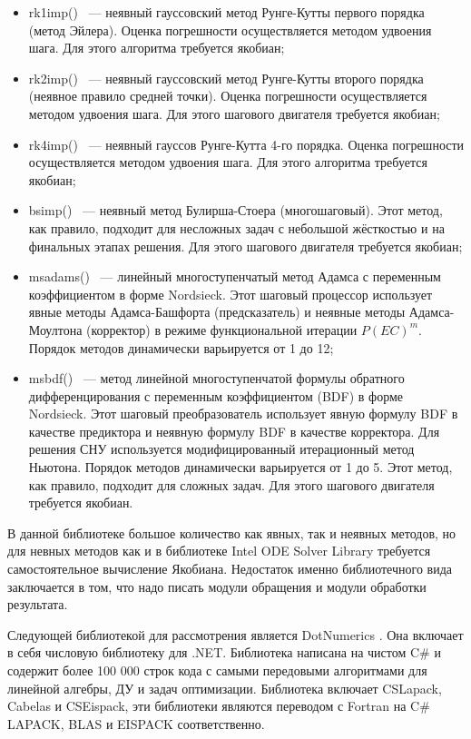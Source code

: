 \begin{itemize}
    \item rk1imp() ~--- неявный гауссовский метод Рунге-Кутты первого порядка (метод Эйлера). Оценка погрешности осуществляется методом
        удвоения шага. Для этого алгоритма требуется якобиан;
    \item rk2imp() ~--- неявный гауссовский метод Рунге-Кутты второго порядка (неявное правило средней точки). Оценка
        погрешности осуществляется методом удвоения шага. Для этого шагового двигателя требуется якобиан;
    \item rk4imp() ~--- неявный гауссов Рунге-Кутта 4-го порядка. Оценка погрешности осуществляется методом удвоения шага. Для этого
        алгоритма требуется якобиан;
    \item bsimp() ~--- неявный метод Булирша-Стоера (многошаговый). Этот метод, как правило, подходит для несложных задач с небольшой
        жёсткостью и на финальных этапах решения. Для этого шагового двигателя требуется якобиан;
    \item msadams() ~--- линейный многоступенчатый метод Адамса с переменным коэффициентом в форме Nordsieck. Этот шаговый процессор
        использует явные методы Адамса-Башфорта (предсказатель) и неявные методы Адамса-Моултона (корректор) в режиме функциональной
        итерации $P(EC)^m$. Порядок методов динамически варьируется от 1 до 12;
    \item msbdf() ~--- метод линейной многоступенчатой формулы обратного дифференцирования с переменным коэффициентом (BDF) в форме
        Nordsieck. Этот шаговый преобразователь использует явную формулу BDF в качестве предиктора и неявную формулу BDF в качестве
        корректора. Для решения СНУ используется модифицированный итерационный метод Ньютона. Порядок методов
        динамически варьируется от 1 до 5. Этот метод, как правило, подходит для сложных задач. Для этого шагового двигателя требуется
        якобиан.
\end{itemize}

В данной библиотеке большое количество как явных, так и неявных методов, но для невных методов как и в библиотеке Intel ODE Solver
Library требуется самостоятельное вычисление Якобиана. Недостаток именно библиотечного вида заключается в том, что надо писать модули
обращения и модули обработки результата.

Следующей библиотекой для рассмотрения является DotNumerics \cite{Wikipedia9}. Она включает в себя числовую библиотеку для .NET. Библиотека написана на
чистом C\# и содержит более 100 000 строк кода с
самыми передовыми алгоритмами для линейной алгебры, ДУ и задач оптимизации. Библиотека
включает CSLapack, Cabelas и CSEispack, эти библиотеки являются переводом с Fortran на C\# LAPACK,
BLAS и EISPACK соответственно.

